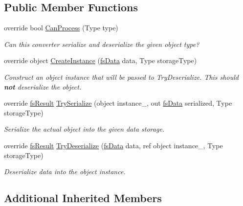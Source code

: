 \subsection*{Public Member Functions}
\begin{DoxyCompactItemize}
\item 
override bool \hyperlink{class_full_serializer_1_1_internal_1_1fs_i_enumerable_converter_a10f24874fda7fcb99a6a8380127dc8d0}{Can\+Process} (Type type)
\begin{DoxyCompactList}\small\item\em Can this converter serialize and deserialize the given object type? \end{DoxyCompactList}\item 
override object \hyperlink{class_full_serializer_1_1_internal_1_1fs_i_enumerable_converter_a787950b2cb51b536dc9fc01f5870f0d9}{Create\+Instance} (\hyperlink{class_full_serializer_1_1fs_data}{fs\+Data} data, Type storage\+Type)
\begin{DoxyCompactList}\small\item\em Construct an object instance that will be passed to Try\+Deserialize. This should {\bfseries not} deserialize the object. \end{DoxyCompactList}\item 
override \hyperlink{struct_full_serializer_1_1fs_result}{fs\+Result} \hyperlink{class_full_serializer_1_1_internal_1_1fs_i_enumerable_converter_a7aaf3b51583371f787df64c3eefc8c87}{Try\+Serialize} (object instance\+\_\+, out \hyperlink{class_full_serializer_1_1fs_data}{fs\+Data} serialized, Type storage\+Type)
\begin{DoxyCompactList}\small\item\em Serialize the actual object into the given data storage. \end{DoxyCompactList}\item 
override \hyperlink{struct_full_serializer_1_1fs_result}{fs\+Result} \hyperlink{class_full_serializer_1_1_internal_1_1fs_i_enumerable_converter_a1585e62338f2abf99911f4fde9599daa}{Try\+Deserialize} (\hyperlink{class_full_serializer_1_1fs_data}{fs\+Data} data, ref object instance\+\_\+, Type storage\+Type)
\begin{DoxyCompactList}\small\item\em Deserialize data into the object instance. \end{DoxyCompactList}\end{DoxyCompactItemize}
\subsection*{Additional Inherited Members}


